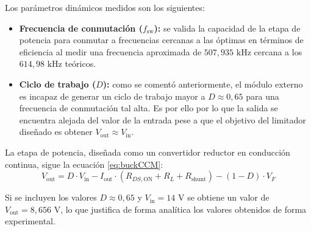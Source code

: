 \documentclass[12pt]{report} %
\begin{document}
Los parámetros dinámicos medidos son los siguientes:
\begin{itemize}
    \item \textbf{Frecuencia de conmutación ($f_{\text{sw}}$):} se valida la capacidad de la etapa de potencia para conmutar a frecuencias cercanas a las óptimas en términos de eficiencia al medir una frecuencia aproximada de $507{,}935\text{ kHz}$ cercana a los $614{,}98\text{ kHz}$ teóricos.
    \item \textbf{Ciclo de trabajo ($D$):} como se comentó anteriormente, el módulo externo es incapaz de generar un ciclo de trabajo mayor a $D \approx 0{,}65$ para una frecuencia de conmutación tal alta. Es por ello por lo que la salida se encuentra alejada del valor de la entrada pese a que el objetivo del limitador diseñado es obtener $V_\text{out}\approx V_\text{in}$.
\end{itemize}

La etapa de potencia, diseñada como un convertidor reductor en conducción continua, sigue la ecuación \ref{eq:buckCCM}:
\begin{equation}
    \label{eq:buckCCM}
    V_{\text{out}} = D \cdot V_{\text{in}} - I_{\text{out}} \cdot (R_{DS,\text{ON}} + R_L + R_{\text{shunt}}) - (1-D) \cdot V_F
\end{equation}

Si se incluyen los valores $D \approx 0{,}65$ y $V_{\text{in}} = 14\text{ V}$ se obtiene un valor de $V_{\text{out}} = 8{,}656\text{ V}$, lo que justifica de forma analítica los valores obtenidos de forma experimental. 
\end{document}
